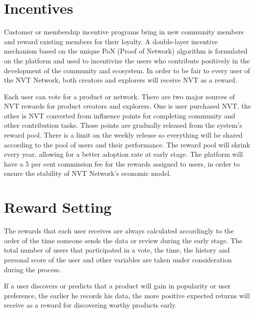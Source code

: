 
\section{Incentives}
Customer or membership incentive programs bring in new community members and reward existing members for their loyalty. A double-layer incentive mechanism based on the unique PoN (Proof of Network) algorithm is formulated on the platform and used to incentivize the users who contribute positively in the development of the community and ecosystem. In order to be fair to every user of the NVT Network, both creators and explorers will receive NVT as a reward.

Each user can vote for a product or network. There are two major sources of NVT rewards for product creators and explorers. One is user purchased NVT, the other is NVT converted from influence points for completing community and other contribution tasks. Those points are gradually released from the system’s reward pool. There is a limit on the weekly release so everything will be shared according to the pool of users and their performance. The reward pool will shrink every year, allowing for a better adoption rate at early stage. The platform will have a 5 per cent commission fee for the rewards assigned to users, in order to ensure the stability of NVT Network’s economic model.


\section{Reward Setting}

The rewards that each user receives are always calculated accordingly to the order of the time someone sends the data or review during the early stage. The total number of users that participated in a vote, the time, the history and personal score of the user and other variables are taken under consideration during the process.

If a user discovers or predicts that a product will gain in popularity or user preference, the earlier he records his data, the more positive expected returns will receive as a reward for discovering worthy products early.

